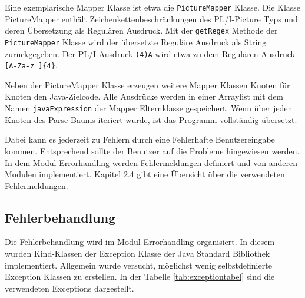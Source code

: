 Eine exemplarische Mapper Klasse ist etwa die \verb+PictureMapper+ Klasse. Die Klasse PictureMapper enthält Zeichenkettenbeschränkungen des PL/I-Picture Typs und deren Übersetzung als Regulären Ausdruck.
Mit der \verb+getRegex+ Methode der \verb+PictureMapper+ Klasse wird der übersetzte Reguläre Ausdruck als String zurückgegeben.
Der PL/I-Ausdruck \verb+(4)A+ wird etwa zu dem Regulären Ausdruck \verb+[A-Za-z ]{4}+.   


Neben der PictureMapper Klasse erzeugen weitere Mapper Klassen Knoten für Knoten den Java-Zielcode. 
Alle Ausdrücke werden in einer Arraylist mit dem Namen \verb+javaExpression+ der Mapper Elternklasse  gespeichert.
Wenn über jeden Knoten des Parse-Baums iteriert wurde, ist das Programm vollständig übersetzt.


Dabei kann es jederzeit zu Fehlern durch eine Fehlerhafte Benutzereingabe kommen.
Entsprechend sollte der Benutzer auf die Probleme hingewiesen werden.
In dem Modul Errorhandling werden Fehlermeldungen definiert und von anderen Modulen implementiert. Kapitel 2.4 gibt eine Übersicht über die verwendeten Fehlermeldungen.

\pagebreak

\subsection{Fehlerbehandlung}
Die Fehlerbehandlung wird im Modul Errorhandling organisiert.
In diesem wurden Kind-Klassen der Exception Klasse der Java Standard Bibliothek implementiert.
Allgemein wurde versucht, möglichst wenig selbstdefinierte Exception Klassen zu erstellen.
In der Tabelle \ref{tab:exceptiontabel} sind die verwendeten Exceptions dargestellt.

